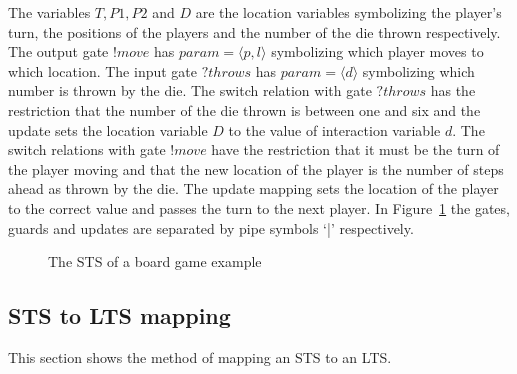 The variables $T, P1, P2$ and $D$ are the location variables symbolizing the player's turn, the positions of the players and the number of the die thrown respectively. The output gate $!move$ has $param = \langle p, l\rangle$ symbolizing which player moves to which location. The input gate $\mathit{?throws}$ has $\mathit{param} = \langle d\rangle$ symbolizing which number is thrown by the die. The switch relation with gate $\mathit{?throws}$ has the restriction that the number of the die thrown is between one and six and the update sets the location variable $D$ to the value of interaction variable $d$. The switch relations with gate $!move$ have the restriction that it must be the turn of the player moving and that the new location of the player is the number of steps ahead as thrown by the die. The update mapping sets the location of the player to the correct value and passes the turn to the next player. In Figure~\ref{fig:example_sts} the gates, guards and updates are separated by pipe symbols `|' respectively.

\begin{figure}[ht]
  \begin{center}
    
  \end{center}
  \caption{The STS of a board game example}
  \label{fig:example_sts}
\end{figure}

\subsection{STS to LTS mapping}\label{sec:sts_lts_trafo}
This section shows the method of mapping an STS to an LTS.

